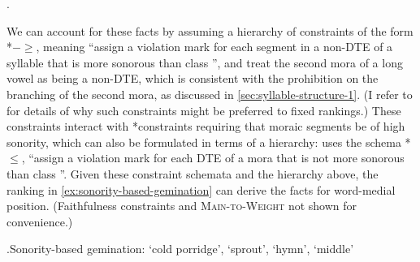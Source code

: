 \ex.\label{ex:gemination-classes}\colorbox{blue!20}{}~~\colorbox{blue!20}{}~

We can account for these facts by assuming a hierarchy of constraints of the form *$-$\ssy$\geq$\ipa{[α]}, meaning \enquote{assign a violation mark for each segment in a non-DTE of a syllable that is more sonorous than class }, and treat the second mora of a long vowel as being a non-DTE,  which is consistent with the prohibition on the branching of the second mora, as discussed in \cref{sec:syllable-structure-1}. (I refer to \citealt{delacy2006} for details of why such constraints might be preferred to fixed rankings.) These constraints interact with *\mo[F] constraints requiring that moraic segments be of high sonority, which can also be formulated in terms of a hierarchy: \citet{delacy2006} uses the schema *\smo$\leq$\ipa{[α]}, \ie \enquote{assign a violation mark for each DTE of a mora that is not more sonorous than class \ipa{[α]}}. Given these constraint schemata and the hierarchy above, the ranking in \ref{ex:sonority-based-gemination} can derive the facts for word\hyp medial position. (Faithfulness constraints and \textsc{Main-to-Weight} not shown for convenience.)

\ex.\label{ex:sonority-based-gemination}Sonority\hyp based gemination: \ipa{[sopas]} `cold porridge', \ipa{[ˈeːɡin]} `sprout', \ipa{[ˈemin]} `hymn', \ipa{[ˈkaːnol]} `middle'\\



